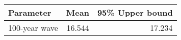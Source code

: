 \begin{tabular}{lrr}
\toprule
     Parameter &    Mean &  95\% Upper bound \\
\midrule
 100-year wave &  16.544 &            17.234 \\
\bottomrule
\end{tabular}
